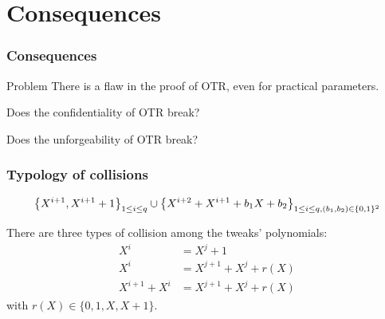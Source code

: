 \documentclass{beamer}
\begin{document}


\section{Consequences} %
\label{sec:consequences}

	\begin{frame}
		\frametitle{Consequences}

		\begin{alertblock}{Problem}
There is a flaw in the proof of OTR, even for practical parameters.
		\end{alertblock}

\vspace{0.4cm}

Does the confidentiality of OTR break?

Does the unforgeability of OTR break?


		
	\end{frame}

	\begin{frame}
		\frametitle{Typology of collisions}
		
		\[
				\left\{X^{i+1}, X^{i+1} +1 \right\}_{1\leq i \leq q} \cup \left\{ X^{i+2} + X^{i+1} + b_1 X + b_2\right\}_{1\leq i \leq q, (b_1,b_2) \in \{0, 1\}^2}
		\]
		
		\vspace{0.5cm}
		There are three types of collision among the tweaks' polynomials:
		\begin{align}
			X^i &= X^j + 1 \\
			X^i & = X^{j+1} + X^j + r(X) \\
			X^{i+1} + X^i & = X^{j+1} + X^j + r(X)
		\end{align}
		with $r(X) \in \{0, 1, X, X+1\}$.
	
	\end{frame}
\end{document}
